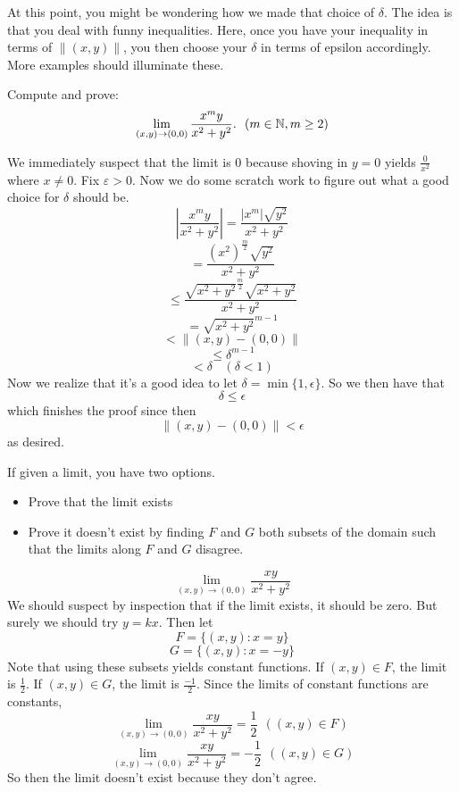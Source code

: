 \documentclass[11pt]{article}
\newcommand{\norm}[1]{\left\lVert #1 \right\rVert}
\newcommand{\ra}{\rightarrow}
\newcommand{\e}{\varepsilon}
\begin{document}
At this point, you might be wondering how we made that choice of $\delta$. The idea is that you deal with funny inequalities. Here, once you have your inequality in terms of $\norm{(x,y)}$, you then choose your $\delta$ in terms of epsilon accordingly. More examples should illuminate these.

\begin{example}
    Compute and prove:
    \[\lim_{(x,y) \ra (0,0)} \frac{x^my}{x^2 + y^2}. \ \ (m \in \N, m \geq 2) \]
    \begin{solution}
        We immediately suspect that the limit is $0$ because shoving in $y = 0$ yields $\frac{0}{x^2}$ where $x \neq 0$. Fix $\e > 0$. Now we do some scratch work to figure out what a good choice for $\delta$ should be. 
        \[| \frac{x^my}{x^2 + y^2} | = \frac{|x^m| \sqrt{y^2}}{x^2+y^2}\]
        \[ = \frac{(x^2)^\frac{m}{2} \sqrt{y^2}}{x^2 + y^2}\]
        \[\leq \frac{\sqrt{x^2 + y^2}^\frac{m}{2} \sqrt{x^2 + y^2}}{x^2 + y^2}\]
        \[= \sqrt{x^2 + y^2}^{m-1}\]
        \[< \norm{(x,y) - (0,0)}\]
        \[\leq \delta^{m-1}\]
        \[< \delta \ \ \ \ (\delta < 1)\]
        Now we realize that it's a good idea to let $\delta = \min\{1, \epsilon\}$. So we then have that 
        \[\delta \leq \epsilon\]
        which finishes the proof since then 
        \[ \norm{(x,y) - (0,0)} < \epsilon\]
        as desired.

    \end{solution}
\end{example}

If given a limit, you have two options.
\begin{itemize}
    \item Prove that the limit exists
    \item Prove it doesn't exist by finding $F$ and $G$ both subsets of the domain such that the limits along $F$ and $G$ disagree.
\end{itemize}

\begin{example}
    \[\lim_{(x,y) \ra (0,0)} \frac{xy}{x^2 + y^2}\]
    We should suspect by inspection that if the limit exists, it should be zero. But surely we should try $y = kx$. Then let
    \[F = \{(x,y): x = y\} \]
    \[G = \{(x,y): x = -y\}\]
    Note that using these subsets yields constant functions. If $(x,y) \in F$, the limit is $\frac{1}{2}$. If $(x,y) \in G$, the limit is $\frac{-1}{2}$. Since the limits of constant functions are constants, 
    \[\lim_{(x,y) \ra (0,0)} \frac{xy}{x^2 + y^2} = \frac{1}{2} \ \ ((x,y) \in F)\] 
    \[\lim_{(x,y) \ra (0,0)} \frac{xy}{x^2 + y^2} = -\frac{1}{2} \ \ ((x,y) \in G)\] 
    So then the limit doesn't exist because they don't agree.
\end{example}
\end{document}
